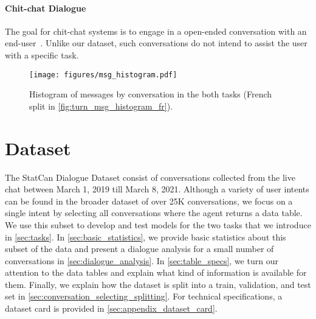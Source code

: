\documentclass[11pt]{article}
\begin{document}
\paragraph{Chit-chat Dialogue}
The goal for chit-chat systems is to engage in a open-ended conversation with an end-user~\cite{lowe_ubuntu_2015, dinan_wizard_2018}. Unlike our dataset, such conversations do not intend to assist the user with a specific task. 


\begin{figure}[t!]
    \centering
    \texttt{[image: figures/msg\_histogram.pdf]}
    \caption{Histogram of messages by conversation in the both tasks (French split in \autoref{fig:turn_msg_histogram_fr}).}
    \label{fig:turn_msg_histogram}\vspace{-3mm}
\end{figure}









\section{Dataset}


The StatCan Dialogue Dataset consist of conversations collected from the live chat between March 1, 2019 till March 8, 2021. Although a variety of user intents can be found in the broader dataset of over 25K conversations, we focus on a single intent by selecting all conversations where the agent returns a data table. We use this subset to develop and test models for the two tasks that we introduce in \autoref{sec:tasks}. In \autoref{sec:basic_statistics}, we provide basic statistics about this subset of the data and present a dialogue analysis for a small number of conversations in \autoref{sec:dialogue_analysis}. In \autoref{sec:table_specs}, we turn our attention to the data tables and explain what kind of information is available for them. Finally, we explain how the dataset is split into a train, validation, and test set in \autoref{sec:conversation_selecting_splitting}. For technical specifications, a dataset card is provided in \autoref{sec:appendix_dataset_card}.
\end{document}
